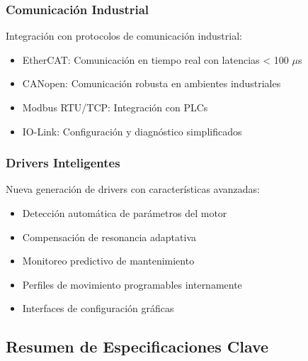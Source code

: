 \subsubsection{Comunicación Industrial}

Integración con protocolos de comunicación industrial:

\begin{itemize}
    \item EtherCAT: Comunicación en tiempo real con latencias < 100 $\mu$s
    \item CANopen: Comunicación robusta en ambientes industriales
    \item Modbus RTU/TCP: Integración con PLCs
    \item IO-Link: Configuración y diagnóstico simplificados
\end{itemize}

\subsubsection{Drivers Inteligentes}

Nueva generación de drivers con características avanzadas:

\begin{itemize}
    \item Detección automática de parámetros del motor
    \item Compensación de resonancia adaptativa
    \item Monitoreo predictivo de mantenimiento
    \item Perfiles de movimiento programables internamente
    \item Interfaces de configuración gráficas
\end{itemize}

\subsection{Resumen de Especificaciones Clave}

